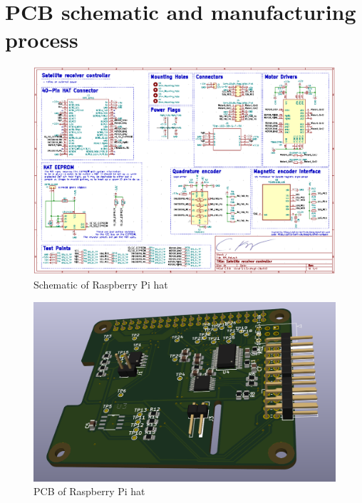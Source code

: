 \section{PCB schematic and manufacturing process}

\begin{figure}[H]
	\centering
	\includegraphics[width=\linewidth]{../art/pcbSchematic.png}
	\caption{Schematic of Raspberry Pi hat}
\end{figure}

\begin{figure}[H]
	\centering
	\includegraphics[scale=0.3]{../art/PCB.png}
	\caption{PCB of Raspberry Pi hat}
\end{figure}



